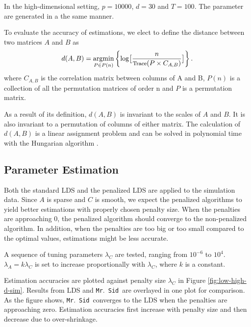 \documentclass[fleqn,12pt]{article}
\let\oldref\ref
\renewcommand{\ref}[1]{(\oldref{#1})}
\newcommand{\mrsid}{{\sc \texttt{Mr}.~\texttt{Sid}}}
\newcommand{\argmin}{\operatornamewithlimits{argmin}}
\begin{document}
In the high-dimensional setting, $p = 10000$, $d = 30$ and $T = 100$. The parameter are generated in a the same manner.

To evaluate the accuracy of estimations, we elect to define the distance between two matrices $A$ and $B$ as
\begin{equation}\label{eq:distance}
d(A,B) = \argmin_{P\in P(n)}\left\{\log\bigl[\frac{n}{\text{\footnotesize Trace}(P\times C_{A,B})}\bigr]\right\}.
\end{equation}
where $C_{A,B}$ is the correlation matrix between columns of A and B, $P(n)$ is a collection of all the permutation matrices of order n and $P$ is a permutation matrix.

As a result of its definition, $d(A,B)$ is invariant to the scales of $A$ and $B$. It is also invariant to a permutation of columns of either matrix. The calculation of $d(A,B)$ is a linear assignment problem and can be solved in polynomial time with the Hungarian algorithm \citep{kuhn1955hungarian}.


\subsection{Parameter Estimation}
\label{sec:lowdsim}

Both the standard LDS and the penalized LDS are applied to the simulation data. Since $A$ is sparse and $C$ is smooth, we expect the penalized algorithms to yield better estimations with properly chosen penalty size. When the penalties are approaching 0, the penalized algorithm should converge to the non-penalized algorithm. In addition, when the penalties are too big or too small compared to the optimal values, estimations might be less accurate.

A sequence of tuning parameters $\lambda_C$ are tested, ranging from $10^{-6}$ to $10^4$. $\lambda_A = k \lambda_C$ is set to increase proportionally with $\lambda_C$, where $k$ is a constant.

Estimation accuracies are plotted against penalty size $\lambda_C$ in Figure \oldref{fig:low-high-d-sim}. Results from LDS and \mrsid~are overlayed in one plot for comparison. As the figure shows, \mrsid~converges to the LDS when the penalties are approaching zero. Estimation accuracies first increase with penalty size and then decrease due to over-shrinkage.
\end{document}

